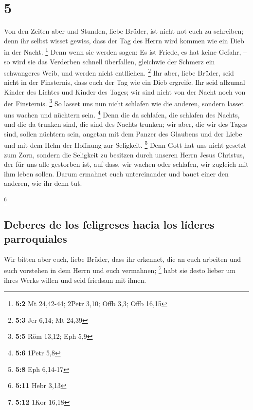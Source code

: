 \hypertarget{section-4}{%
\section{5}\label{section-4}}

 Von den Zeiten aber und Stunden, liebe Brüder, ist nicht
not euch zu schreiben;  denn ihr selbst wisset gewiss,
dass der Tag des Herrn wird kommen wie ein Dieb in der Nacht.
\footnote{\textbf{5:2} Mt 24,42-44; 2Petr 3,10; Offb 3,3; Offb 16,15}
 Denn wenn sie werden sagen: Es ist Friede, es hat keine
Gefahr, -- so wird sie das Verderben schnell überfallen, gleichwie der
Schmerz ein schwangeres Weib, und werden nicht entfliehen. \footnote{\textbf{5:3}
  Jer 6,14; Mt 24,39}  Ihr aber, liebe Brüder, seid nicht
in der Finsternis, dass euch der Tag wie ein Dieb ergreife.
 Ihr seid allzumal Kinder des Lichtes und Kinder des
Tages; wir sind nicht von der Nacht noch von der Finsternis. \footnote{\textbf{5:5}
  Röm 13,12; Eph 5,9}  So lasset uns nun nicht schlafen
wie die anderen, sondern lasset uns wachen und nüchtern sein.
\footnote{\textbf{5:6} 1Petr 5,8}  Denn die da schlafen,
die schlafen des Nachts, und die da trunken sind, die sind des Nachts
trunken;  wir aber, die wir des Tages sind, sollen
nüchtern sein, angetan mit dem Panzer des Glaubens und der Liebe und mit
dem Helm der Hoffnung zur Seligkeit. \footnote{\textbf{5:8} Eph 6,14-17}
 Denn Gott hat uns nicht gesetzt zum Zorn, sondern die
Seligkeit zu besitzen durch unseren Herrn Jesus Christus,
 der für uns alle gestorben ist, auf dass, wir wachen
oder schlafen, wir zugleich mit ihm leben sollen.  Darum
ermahnet euch untereinander und bauet einer den anderen, wie ihr denn
tut.

\footnote{\textbf{5:11} Hebr 3,13}

\hypertarget{deberes-de-los-feligreses-hacia-los-luxedderes-parroquiales}{%
\subsection{Deberes de los feligreses hacia los líderes
parroquiales}\label{deberes-de-los-feligreses-hacia-los-luxedderes-parroquiales}}

 Wir bitten aber euch, liebe Brüder, dass ihr erkennet,
die an euch arbeiten und euch vorstehen in dem Herrn und euch vermahnen;
\footnote{\textbf{5:12} 1Kor 16,18}  habt sie desto
lieber um ihres Werks willen und seid friedsam mit ihnen.

